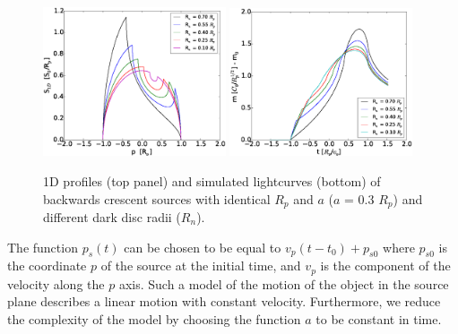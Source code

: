 \documentclass[usenatbib]{mn2e}
\begin{document}
\begin{figure}
\centering
    \includegraphics[width = 0.48\textwidth]{figures/S1D_var_rn_a_poz.eps}
    \includegraphics[width = 0.48\textwidth]{figures/5Rn_back_var_magnification.eps}
\caption{\label{fig:lightcurve_crescent_back} 1D profiles (top panel) and simulated lightcurves (bottom) of backwards crescent sources with identical $R_p$ and $a$ ($a$ = 0.3 $R_p$) and different dark disc radii ($R_n$).}
\end{figure}

The function $p_s(t)$ can be chosen to be equal to $v_p(t-t_0) + p_{s0}$ where $p_{s0}$ is the coordinate $p$ 
of the source at the initial time, and $v_p$ is the component of the velocity
along the $p$ axis. Such a model of the motion of the object in the source 
plane describes a linear motion with constant velocity. Furthermore, we reduce the complexity of the model by 
choosing the function $a$ to be constant in time.  
\end{document}
